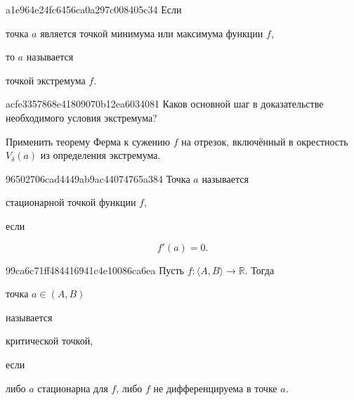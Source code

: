\begin{note}{a1e964e24fc6456ca0a297c008405c34}
    Если \begin{icloze}{2}точка \( a \) является точкой минимума или максимума функции \( f \),\end{icloze} то \( a \) называется \begin{icloze}{1}точкой экстремума \( f \).\end{icloze}
\end{note}


\begin{note}{acfe3357868e41809070b12ea6034081}
    Каков основной шаг в доказательстве необходимого условия экстремума?

    \begin{cloze}{1}
        Применить теорему Ферма к сужению \({ f }\) на отрезок, включённый в окрестность \({ V_\delta(a) }\) из определения экстремума.
    \end{cloze}
\end{note}

\begin{note}{96502706cad4449ab9ac44074765a384}
    Точка \( a \) называется \begin{icloze}{1}стационарной точкой функции \( f \),\end{icloze} если
    \begin{icloze}{2}\[
        f'(a) = 0.
    \]\end{icloze}
\end{note}

\begin{note}{99ca6c71ff484416941c4e10086ca6ea}
    Пусть \( f : \langle A, B \rangle \to \mathbb R \). Тогда
    \begin{icloze}{1}точка \( a \in (A, B) \)\end{icloze} называется \begin{icloze}{2}критической
    точкой,\end{icloze} если \begin{icloze}{1}либо \( a \) стационарна для \( f \), либо \(
    f \) не дифференцируема в точке \( a \).\end{icloze}
\end{note}

